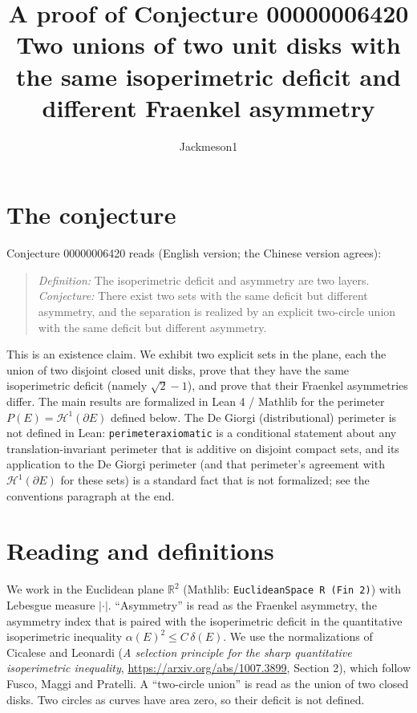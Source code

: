 \documentclass[11pt]{article}
\title{A proof of Conjecture 00000006420\\[2pt]
\large Two unions of two unit disks with the same isoperimetric deficit and different Fraenkel asymmetry}
\author{Jackmeson1}
\date{}
\theoremstyle{definition}
\theoremstyle{remark}
\renewcommand{\_}{\oldus\allowbreak}
\newcommand{\R}{\mathbb{R}}
\begin{document}
\sloppy
\maketitle

\section{The conjecture}

Conjecture 00000006420 reads (English version; the Chinese version agrees):

\begin{quote}
\emph{Definition:} The isoperimetric deficit and asymmetry are two layers.
\emph{Conjecture:} There exist two sets with the same deficit but different asymmetry, and the
separation is realized by an explicit two-circle union with the same deficit but different
asymmetry.
\end{quote}

This is an existence claim. We exhibit two explicit sets in the plane, each the union of two
disjoint closed unit disks, prove that they have the same isoperimetric deficit (namely
$\sqrt2-1$), and prove that their Fraenkel asymmetries differ. The main results are formalized in
Lean 4 / Mathlib for the perimeter $P(E)=\mathcal H^1(\partial E)$ defined below. The De Giorgi
(distributional) perimeter is not defined in Lean: \texttt{perimeter\_axiomatic} is a conditional
statement about any translation-invariant perimeter that is additive on disjoint compact sets, and
its application to the De Giorgi perimeter (and that perimeter's agreement with $\mathcal H^1(\partial
E)$ for these sets) is a standard fact that is not formalized; see the conventions paragraph at the
end.

\section{Reading and definitions}

We work in the Euclidean plane $\R^2$ (Mathlib: \texttt{EuclideanSpace R (Fin 2)}) with Lebesgue
measure $|\cdot|$. ``Asymmetry'' is read as the Fraenkel asymmetry, the asymmetry index that is
paired with the isoperimetric deficit in the quantitative isoperimetric inequality
$\alpha(E)^2\le C\,\delta(E)$. We use the normalizations of Cicalese and Leonardi
(\emph{A selection principle for the sharp quantitative isoperimetric inequality},
\url{https://arxiv.org/abs/1007.3899}, Section 2), which follow Fusco, Maggi and Pratelli. A
``two-circle union'' is read as the union of two closed disks. Two circles as curves have area
zero, so their deficit is not defined.
\end{document}

